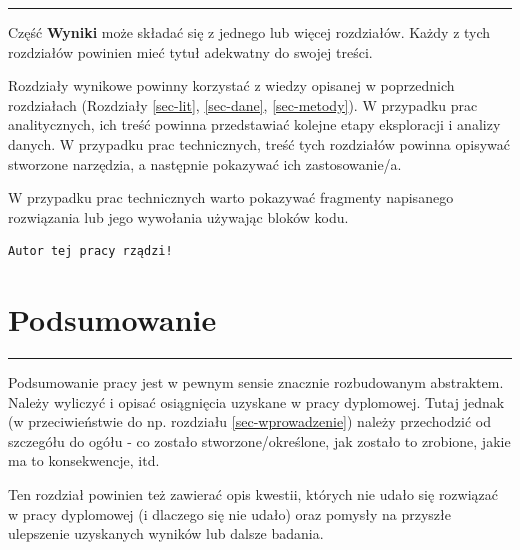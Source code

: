 \documentclass{amuthesis}
\begin{document}
\begin{center}\rule{0.5\linewidth}{0.5pt}\end{center}

Część \textbf{Wyniki} może składać się z jednego lub więcej rozdziałów.
Każdy z tych rozdziałów powinien mieć tytuł adekwatny do swojej treści.

Rozdziały wynikowe powinny korzystać z wiedzy opisanej w poprzednich
rozdziałach (Rozdziały \ref{sec-lit}, \ref{sec-dane}, \ref{sec-metody}).
W przypadku prac analitycznych, ich treść powinna przedstawiać kolejne
etapy eksploracji i analizy danych. W przypadku prac technicznych, treść
tych rozdziałów powinna opisywać stworzone narzędzia, a następnie
pokazywać ich zastosowanie/a.

W przypadku prac technicznych warto pokazywać fragmenty napisanego
rozwiązania lub jego wywołania używając bloków kodu.

\begin{Shaded}
\begin{Highlighting}[]
\OtherTok{=} 
  \NormalTok{)}
\NormalTok{\}}
\NormalTok{(}\NormalTok{)}
\end{Highlighting}
\end{Shaded}

\begin{verbatim}
Autor tej pracy rządzi!
\end{verbatim}


\hypertarget{podsumowanie}{%
\chapter{Podsumowanie}\label{podsumowanie}}

\begin{center}\rule{0.5\linewidth}{0.5pt}\end{center}

Podsumowanie pracy jest w pewnym sensie znacznie rozbudowanym
abstraktem. Należy wyliczyć i opisać osiągnięcia uzyskane w pracy
dyplomowej. Tutaj jednak (w przeciwieństwie do np. rozdziału
\ref{sec-wprowadzenie}) należy przechodzić od szczegółu do ogółu - co
zostało stworzone/określone, jak zostało to zrobione, jakie ma to
konsekwencje, itd.

Ten rozdział powinien też zawierać opis kwestii, których nie udało się
rozwiązać w pracy dyplomowej (i dlaczego się nie udało) oraz pomysły na
przyszłe ulepszenie uzyskanych wyników lub dalsze badania.

\printbibliography[heading=bibintoc, title=Bibliografia]
\end{document}
